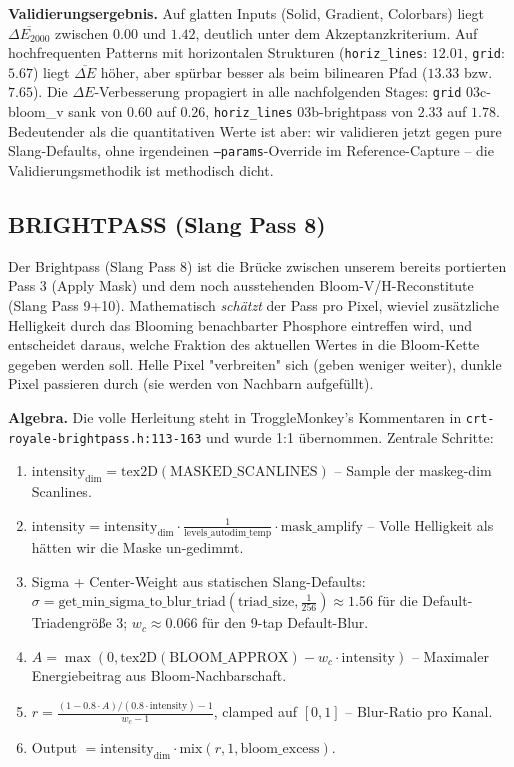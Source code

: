 \documentclass[11pt, a4paper]{article}
\begin{document}
\vspace{.5cm}
\textbf{Validierungsergebnis.} Auf glatten Inputs (Solid, Gradient, Colorbars) liegt $\overline{\Delta E_{2000}}$ zwischen $0.00$ und $1.42$, deutlich unter dem Akzeptanzkriterium. Auf hochfrequenten Patterns mit horizontalen Strukturen (\texttt{horiz\_lines}: $12.01$, \texttt{grid}: $5.67$) liegt $\overline{\Delta E}$ h\"oher, aber sp\"urbar besser als beim bilinearen Pfad ($13.33$ bzw. $7.65$). Die $\Delta E$-Verbesserung propagiert in alle nachfolgenden Stages: \texttt{grid} 03c-bloom\_v sank von $0.60$ auf $0.26$, \texttt{horiz\_lines} 03b-brightpass von $2.33$ auf $1.78$. Bedeutender als die quantitativen Werte ist aber: wir validieren jetzt gegen pure Slang-Defaults, ohne irgendeinen \texttt{--params}-Override im Reference-Capture -- die Validierungsmethodik ist methodisch dicht.

\vspace{.5cm}
\subsection{BRIGHTPASS (Slang Pass 8)}
\vspace{.5cm}
Der Brightpass (Slang Pass 8) ist die Br\"ucke zwischen unserem bereits portierten Pass 3 (Apply Mask) und dem noch ausstehenden Bloom-V/H-Reconstitute (Slang Pass 9+10). Mathematisch \emph{sch\"atzt} der Pass pro Pixel, wieviel zus\"atzliche Helligkeit durch das Blooming benachbarter Phosphore eintreffen wird, und entscheidet daraus, welche Fraktion des aktuellen Wertes in die Bloom-Kette gegeben werden soll. Helle Pixel "verbreiten" sich (geben weniger weiter), dunkle Pixel passieren durch (sie werden von Nachbarn aufgef\"ullt).

\vspace{.5cm}
\textbf{Algebra.} Die volle Herleitung steht in TroggleMonkey's Kommentaren in \texttt{crt-royale-brightpass.h:113-163} und wurde 1:1 \"ubernommen. Zentrale Schritte:
\begin{enumerate}[leftmargin=*, nosep]
    \item $\mathrm{intensity}_{\mathrm{dim}} = \mathrm{tex2D}(\mathrm{MASKED\_SCANLINES})$ -- Sample der maskeg-dim Scanlines.
    \item $\mathrm{intensity} = \mathrm{intensity}_{\mathrm{dim}} \cdot \frac{1}{\mathrm{levels\_autodim\_temp}} \cdot \mathrm{mask\_amplify}$ -- Volle Helligkeit als h\"atten wir die Maske un-gedimmt.
    \item Sigma + Center-Weight aus statischen Slang-Defaults: $\sigma = \text{get\_min\_sigma\_to\_blur\_triad}(\mathrm{triad\_size}, \frac{1}{256}) \approx 1.56$ f\"ur die Default-Triadengr\"o{\ss}e 3; $w_c \approx 0.066$ f\"ur den 9-tap Default-Blur.
    \item $A = \max(0, \mathrm{tex2D}(\mathrm{BLOOM\_APPROX}) - w_c \cdot \mathrm{intensity})$ -- Maximaler Energiebeitrag aus Bloom-Nachbarschaft.
    \item $r = \frac{(1 - 0.8 \cdot A) / (0.8 \cdot \mathrm{intensity}) - 1}{w_c - 1}$, clamped auf $[0, 1]$ -- Blur-Ratio pro Kanal.
    \item Output $= \mathrm{intensity}_{\mathrm{dim}} \cdot \mathrm{mix}(r, 1, \mathrm{bloom\_excess})$.
\end{enumerate}
\end{document}
